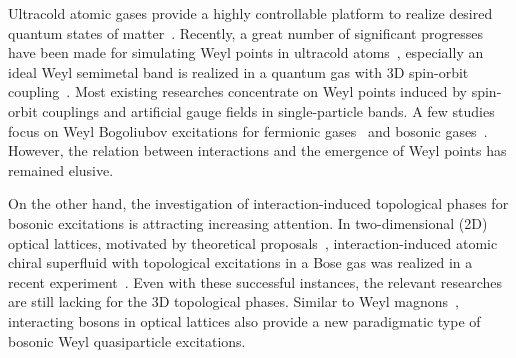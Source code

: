 \documentclass[aps,pra,floatfix,twocolumn,superscriptaddress]{revtex4-1}
\begin{document}
Ultracold atomic gases provide a highly controllable platform to realize desired quantum states of matter~\cite{Lewenstein2007,Bloch2012,Gross2017,Schafer2020}. Recently, a great number of significant progresses have been made for simulating Weyl points in ultracold atoms~\cite{PhysRevA.85.033640,PhysRevLett.114.225301,PhysRevA.92.013632,PhysRevA.94.013606,PhysRevA.94.043617,PhysRevA.95.033629,PhysRevResearch.1.033102,LU20202080,wang2021realization,PhysRevLett.112.136402,PhysRevLett.114.045302,PhysRevLett.115.265304,PhysRevB.96.035145,PhysRevA.104.033312,PhysRevA.95.023620}, especially an ideal Weyl semimetal band is realized in a quantum gas with 3D spin-orbit coupling~\cite{wang2021realization}. Most existing researches concentrate on Weyl points induced by spin-orbit couplings and artificial gauge fields in single-particle bands. A few studies focus on Weyl Bogoliubov excitations for fermionic gases~\cite{PhysRevLett.112.136402,PhysRevLett.114.045302,PhysRevLett.115.265304,PhysRevB.96.035145,PhysRevA.104.033312} and bosonic gases~\cite{PhysRevA.95.023620}. However, the relation between interactions and the emergence of Weyl points has remained elusive.

On the other hand, the investigation of interaction-induced topological phases for bosonic excitations is attracting increasing attention. In two-dimensional (2D) optical lattices, motivated by theoretical proposals~\cite{PhysRevLett.117.085301,PhysRevLett.117.163001,PhysRevA.98.053617,PhysRevA.103.043328}, interaction-induced atomic chiral superfluid with topological excitations in a Bose gas was realized in a recent experiment~\cite{Wang2021}. Even with these successful instances, the relevant researches are still lacking for the 3D topological phases. Similar to Weyl magnons~\cite{Li2016,PhysRevLett.117.157204,PhysRevB.95.224403,PhysRevB.95.085132,PhysRevB.96.104437,PhysRevB.97.094412,PhysRevB.97.115162}, interacting bosons in optical lattices also provide a new paradigmatic type of bosonic Weyl quasiparticle excitations.
\end{document}
